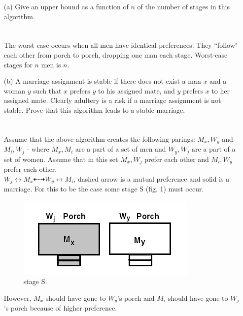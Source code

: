 \documentclass[10pt]{article}
\begin{document}
			\begin{enumerate}
				\item[(a)]  Give an upper bound as a function of $n$ of the number of stages in this algorithm.\\
										\\
										\\
										The worst case occurs when all men have identical preferences. They ``follow" each other
										from porch to porch, dropping one man each stage. Worst-case stages for $n$ men is $n$.\\
				\item[(b)]  A marriage assignment is stable if there does not exist a man $x$ and a woman $y$  such that $x$
										prefers $y$ to his assigned mate, and $y$ prefers $x$ to her assigned mate. Clearly adultery is a risk if
										a marriage assignment is not stable. Prove that this algorithm leads to a stable marriage.\\
										\\
										\\
										Assume that the above algorithm creates the following parings: $M_x, W_y$ and $M_i, W_j$ - where $M_x, M_i$ are
										a part of a set of men and $W_y, W_j$ are a part of a set of women. Assume that in this set $M_x, W_j$ prefer
										each other and $M_i, W_y$ prefer each other.\\
										$W_j \leftrightarrow M_x \dashleftarrow \dashrightarrow W_y \leftrightarrow M_i$, dashed arrow is a mutual 
										preference and solid is a marriage. For this to be the case some stage S (fig. 1) must occur.\\
										\begin{figure}[h]
											\centering
												\includegraphics{15b.png}
											  \caption{stage S.}
										\end{figure}
										\linebreak
										However, $M_x$ should have gone to $W_y$'s porch and $M_i$ should have gone to $W_j$'s porch because of higher
										preference. 

\end{enumerate}
\end{document}
